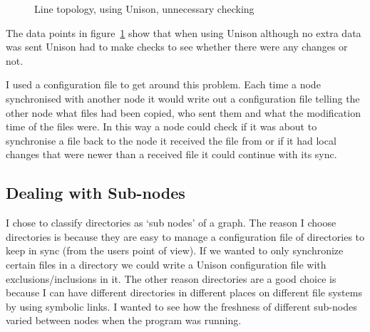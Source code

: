 \documentclass[12pt]{article}
\begin{document}
\begin{figure}[htp]
    \caption{Line topology, using Unison, unnecessary checking}
    \label{fig:line_uni_tail_graph}
\end{figure}

The data points in figure~\ref{fig:line_uni_tail_graph} show that when using
Unison although no extra data was sent Unison had to make checks to see
whether there were any changes or not.

I used a configuration file to get around this problem. Each time a node
synchronised with another node it would write out a configuration file telling
the other node what files had been copied, who sent them and what the
modification time of the files were. In this way a node could check
if it was about to synchronise a file back to the node it received
the file from or if it had local changes that were newer than a received
file it could continue with its sync.

\subsection{Dealing with Sub-nodes}
\label{sec:subnodes}
I chose to classify directories as `sub nodes' of a graph. The reason I choose
directories is because they are easy to manage a configuration file of directories to
keep in sync (from the users point of view). If we wanted to only synchronize
certain files in a directory we could write a Unison configuration file with 
exclusions/inclusions in it. The other reason directories are a good choice
is because I can have different directories in different places on different
file systems by using symbolic links. I wanted to see how the freshness of different
sub-nodes varied between nodes when the program was running.
\end{document}
